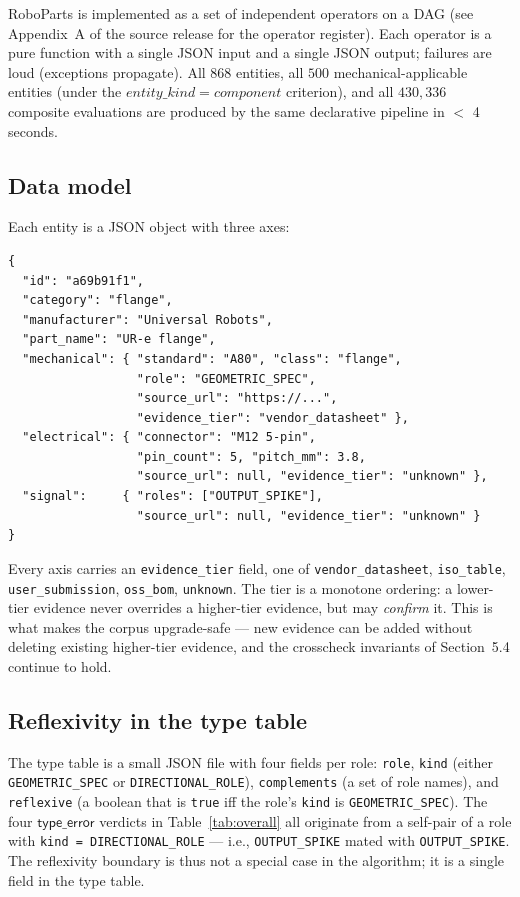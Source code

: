 \documentclass[review]{elsarticle}
\begin{document}
RoboParts is implemented as a set of independent operators on a
DAG (see Appendix~A of the source release for the operator
register). Each operator is a pure function with a single JSON
input and a single JSON output; failures are loud (exceptions
propagate). All $868$ entities, all $500$ mechanical-applicable
entities (under the $entity\_kind=component$ criterion), and all
$430{,}336$ composite evaluations are produced by the same
declarative pipeline in $<$ 4 seconds.

\subsection{Data model}

Each entity is a JSON object with three axes:

\begin{verbatim}
{
  "id": "a69b91f1",
  "category": "flange",
  "manufacturer": "Universal Robots",
  "part_name": "UR-e flange",
  "mechanical": { "standard": "A80", "class": "flange",
                  "role": "GEOMETRIC_SPEC",
                  "source_url": "https://...",
                  "evidence_tier": "vendor_datasheet" },
  "electrical": { "connector": "M12 5-pin",
                  "pin_count": 5, "pitch_mm": 3.8,
                  "source_url": null, "evidence_tier": "unknown" },
  "signal":     { "roles": ["OUTPUT_SPIKE"],
                  "source_url": null, "evidence_tier": "unknown" }
}
\end{verbatim}

Every axis carries an \texttt{evidence\_tier} field, one of
\texttt{vendor\_datasheet}, \texttt{iso\_table}, \texttt{user\_submission},
\texttt{oss\_bom}, \texttt{unknown}. The tier is a monotone ordering:
a lower-tier evidence never overrides a higher-tier evidence, but
may \emph{confirm} it. This is what makes the corpus upgrade-safe
— new evidence can be added without deleting existing higher-tier
evidence, and the crosscheck invariants of Section~5.4 continue to
hold.

\subsection{Reflexivity in the type table}

The type table is a small JSON file with four fields per role:
\texttt{role}, \texttt{kind} (either \texttt{GEOMETRIC\_SPEC} or
\texttt{DIRECTIONAL\_ROLE}), \texttt{complements} (a set of role names),
and \texttt{reflexive} (a boolean that is \texttt{true} iff the
role's \texttt{kind} is \texttt{GEOMETRIC\_SPEC}). The four $\mathsf{type\_error}$
verdicts in Table~\ref{tab:overall} all originate from a
self-pair of a role with \texttt{kind = DIRECTIONAL\_ROLE} — i.e.,
\texttt{OUTPUT\_SPIKE} mated with \texttt{OUTPUT\_SPIKE}. The
reflexivity boundary is thus not a special case in the algorithm;
it is a single field in the type table.
\end{document}
